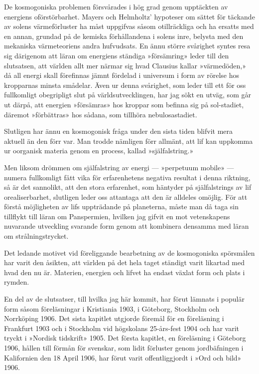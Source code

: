 \documentclass[a4paper, 12pt, oneside, swedish]{article}
\begin{document}
De kosmogoniska problemen försvårades i hög grad genom upptäckten av energiens oförstörbarhet. Mayers och Helmholtz' hypoteser om sättet för täckande av solens värmeförluster ha måst uppgifvas såsom otillräckliga och ha ersatts med en annan, grundad på de kemiska förhållandena i solens inre, belysta med den mekaniska värmeteoriens andra hufvudsats. En ännu större svårighet syntes resa sig därigenom att läran om energiens ständiga »försämring» leder till den slutsatsen, att världen allt mer närmar sig hvad Clausius kallar »värmedöden,» då all energi skall förefinnas jämnt fördelad i universum i form av rörelse hos kropparnas minsta smådelar. Även ur denna svårighet, som leder till ett för oss fullkomligt obegripligt slut på världsutvecklingen, har jag sökt en utväg, som går ut därpå, att energien »försämras» hos kroppar som befinna sig på sol-stadiet, däremot »förbättras» hos sådana, som tillhöra nebulosastadiet.

Slutligen har ännu en kosmogonisk fråga under den sista tiden blifvit mera aktuell än den förr var. Man trodde nämligen förr allmänt, att lif kan uppkomma ur oorganisk materia genom en process, kallad »själfalstring.»

Men liksom drömmen om själfalstring av energi --- »perpetuum mobile» --- numera fullkomligt fått vika för erfarenhetens negativa resultat i denna riktning, så är det sannolikt, att den stora erfarenhet, som häntyder på själfalstrings av lif orealiserbarhet, slutligen leder oss attantaga att den är alldeles omöjlig. För att förstå möjligheten av lifs uppträdande på planeterna, måste man då taga sin tillflykt till läran om Panspermien, hvilken jag gifvit en mot vetenskapens nuvarande utveckling svarande form genom att kombinera densamma med läran om strålningstrycket.

Det ledande motivet vid föreliggande bearbetning av de kosmogoniska spörsmålen har varit den åsikten, att världen på det hela taget ständigt varit likartad med hvad den nu är. Materien, energien och lifvet ha endast växlat form och plats i rymden.

En del av de slutsatser, till hvilka jag här kommit, har förut lämnats i populär form såsom föreläsningar i Kristiania 1903, i Göteborg, Stockholm och Norrköping 1906. Det sista kapitlet utgjorde föremål för en föreläsning i Frankfurt 1903 och i Stockholm vid högskolans 25-års-fest 1904 och har varit tryckt i »Nordisk tidskrift» 1905. Det första kapitlet, en föreläsning i Göteborg 1906, hållen till förmån för svenskar, som lidit förluster genom jordbäfningen i Kalifornien den 18 April 1906, har förut varit offentliggjordt i »Ord och bild» 1906.
\end{document}
